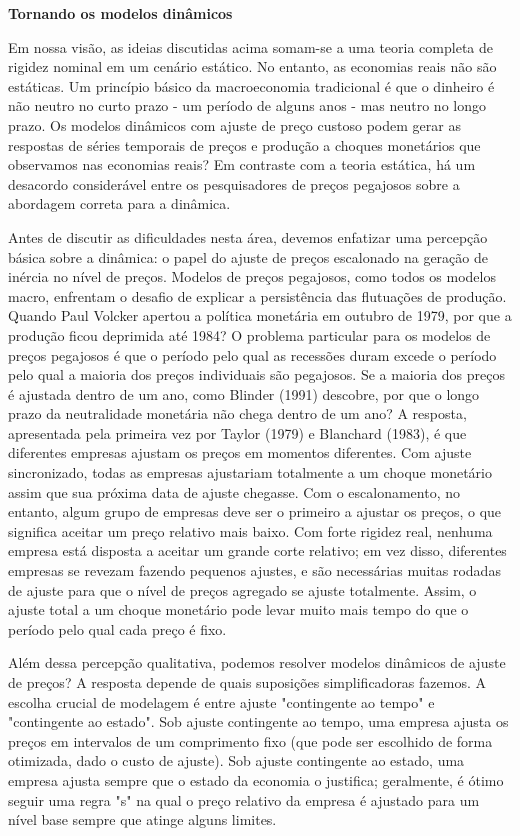 \documentclass[a4paper,12pt]{article}[abntex2]
\begin{document}
\textbf{Tornando os modelos dinâmicos}

Em nossa visão, as ideias discutidas acima somam-se a uma teoria completa de rigidez nominal em um cenário estático. No entanto, as economias reais não são estáticas. Um princípio básico da macroeconomia tradicional é que o dinheiro é não neutro no curto prazo - um período de alguns anos - mas neutro no longo prazo. Os modelos dinâmicos com ajuste de preço custoso podem gerar as respostas de séries temporais de preços e produção a choques monetários que observamos nas economias reais? Em contraste com a teoria estática, há um desacordo considerável entre os pesquisadores de preços pegajosos sobre a abordagem correta para a dinâmica.

Antes de discutir as dificuldades nesta área, devemos enfatizar uma percepção básica sobre a dinâmica: o papel do ajuste de preços escalonado na geração de inércia no nível de preços. Modelos de preços pegajosos, como todos os modelos macro, enfrentam o desafio de explicar a persistência das flutuações de produção. Quando Paul Volcker apertou a política monetária em outubro de 1979, por que a produção ficou deprimida até 1984? O problema particular para os modelos de preços pegajosos é que o período pelo qual as recessões duram excede o período pelo qual a maioria dos preços individuais são pegajosos. Se a maioria dos preços é ajustada dentro de um ano, como Blinder (1991) descobre, por que o longo prazo da neutralidade monetária não chega dentro de um ano? A resposta, apresentada pela primeira vez por Taylor (1979) e Blanchard (1983), é que diferentes empresas ajustam os preços em momentos diferentes. Com ajuste sincronizado, todas as empresas ajustariam totalmente a um choque monetário assim que sua próxima data de ajuste chegasse. Com o escalonamento, no entanto, algum grupo de empresas deve ser o primeiro a ajustar os preços, o que significa aceitar um preço relativo mais baixo. Com forte rigidez real, nenhuma empresa está disposta a aceitar um grande corte relativo; em vez disso, diferentes empresas se revezam fazendo pequenos ajustes, e são necessárias muitas rodadas de ajuste para que o nível de preços agregado se ajuste totalmente. Assim, o ajuste total a um choque monetário pode levar muito mais tempo do que o período pelo qual cada preço é fixo.

Além dessa percepção qualitativa, podemos resolver modelos dinâmicos de ajuste de preços? A resposta depende de quais suposições simplificadoras fazemos. A escolha crucial de modelagem é entre ajuste "contingente ao tempo" e "contingente ao estado". Sob ajuste contingente ao tempo, uma empresa ajusta os preços em intervalos de um comprimento fixo (que pode ser escolhido de forma otimizada, dado o custo de ajuste). Sob ajuste contingente ao estado, uma empresa ajusta sempre que o estado da economia o justifica; geralmente, é ótimo seguir uma regra "s" na qual o preço relativo da empresa é ajustado para um nível base sempre que atinge alguns limites.
\end{document}
